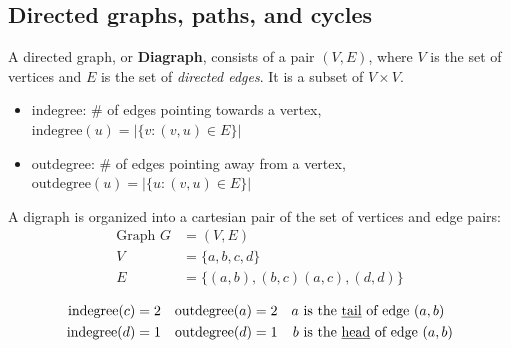 \subsection{Directed graphs, paths, and cycles}

A directed graph, or \textbf{Diagraph}, consists of a pair $(V,E)$, where $V$ is the set of vertices
and $E$ is the set of \textit{directed edges}. It is a subset of $V \times V$.
\begin{itemize}
  \item indegree: \# of edges pointing towards a vertex, $\text{indegree}(u) = \left\lvert\{v : (v,u) \in E\}\right\rvert$
  \item outdegree: \# of edges pointing away from a vertex, $\text{outdegree}(u) = \left\lvert\{u : (v,u) \in E\}\right\rvert$
\end{itemize}
A digraph is organized into a cartesian pair of the set of vertices and edge pairs:
\begin{align*}
  \text{Graph } G & = (V,E)                      \\
  V               & = \{a,b,c,d\}                \\
  E               & = \{(a,b),(b,c)(a,c),(d,d)\}
\end{align*}
\begin{center}
\end{center}
\begin{align*}
  \text{indegree}(c) & = 2 & \text{outdegree}(a) & = 2 & a & \text{ is the \underline{tail} of edge $(a,b)$} \\
  \text{indegree}(d) & = 1 & \text{outdegree}(d) & = 1 & b & \text{ is the \underline{head} of edge $(a,b)$} \\
\end{align*}

